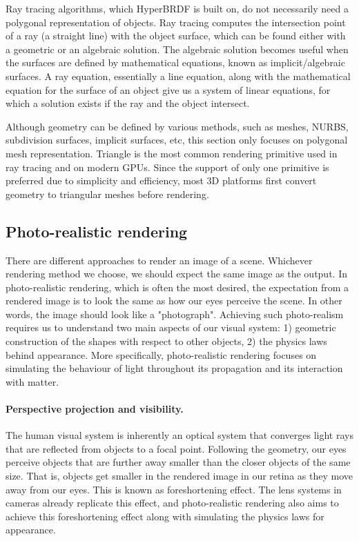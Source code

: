 Ray tracing algorithms, which HyperBRDF is built on, do not necessarily need a polygonal representation of objects. Ray tracing computes the intersection point of a ray (a straight line) with the object surface, which can be found either with a geometric or an algebraic solution. The algebraic solution becomes useful when the surfaces are defined by mathematical equations, known as implicit/algebraic surfaces. A ray equation, essentially a line equation, along with the mathematical equation for the surface of an object give us a system of linear equations, for which a solution exists if the ray and the object intersect.

 Although geometry can be defined by various methods, such as meshes, NURBS, subdivision surfaces, implicit surfaces, etc, this section only focuses on polygonal mesh representation. Triangle is the most common rendering primitive used in ray tracing and on modern GPUs. Since the support of only one primitive is preferred due to simplicity and efficiency, most 3D platforms first convert geometry to triangular meshes before rendering.
 
\subsection{Photo-realistic rendering}
There are different approaches to render an image of a scene. Whichever rendering method we choose, we should expect the same image as the output. In photo-realistic rendering, which is often the most desired, the expectation from a rendered image is to look the same as how our eyes perceive the scene. In other words, the image should look like a "photograph". Achieving such photo-realism requires us to understand two main aspects of our visual system: 1) geometric construction of the shapes with respect to other objects, 2) the physics laws behind appearance. More specifically, photo-realistic rendering focuses on simulating the behaviour of light throughout its propagation and its interaction with matter.

\paragraph{Perspective projection and visibility.}

The human visual system is inherently an optical system that converges light rays that are reflected from objects to a focal point. Following the geometry, our eyes perceive objects that are further away smaller than the closer objects of the same size. That is, objects get smaller in the rendered image in our retina as they move away from our eyes. This is known as foreshortening effect. The lens systems in cameras already replicate this effect, and photo-realistic rendering also aims to achieve this foreshortening effect along with simulating the physics laws for appearance.  

